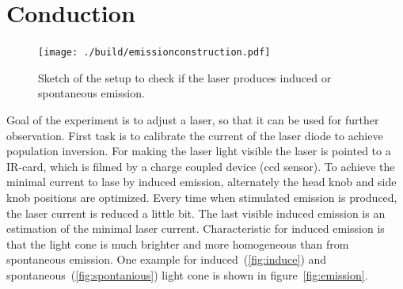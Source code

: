 \section{Conduction}%
\label{sec:conduction}
\begin{figure}
		\centering
		\texttt{[image: ./build/emissionconstruction.pdf]}
		\caption{Sketch of the setup to check if the laser produces induced or
		spontaneous emission. \cite{anleitung}}
		\label{fig:aufbau}
\end{figure}
Goal of the experiment is to adjust a laser, so that it can be used for further
observation.
First task is to calibrate the current of the laser diode to achieve population inversion.
For making the laser light visible the laser is pointed to a IR-card,
which is filmed by a charge coupled device (ccd sensor).
To achieve the minimal current to lase by induced emission, alternately the head
knob and side knob positions are optimized.
Every time when stimulated emission is produced, the laser current is reduced a
little bit.
The last visible induced emission is an estimation of the minimal laser current.
Characteristic for induced emission is that the light cone is
much brighter and more homogeneous than from spontaneous emission.
One example for induced~(\ref{fig:induce}) and spontaneous~(\ref{fig:spontanious}) light cone is
shown in figure~\ref{fig:emission}.
